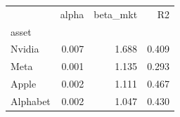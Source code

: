 \begin{tabular}{lrrr}
\toprule
 & alpha & beta_mkt & R2 \\
asset &  &  &  \\
\midrule
Nvidia & 0.007 & 1.688 & 0.409 \\
Meta & 0.001 & 1.135 & 0.293 \\
Apple & 0.002 & 1.111 & 0.467 \\
Alphabet & 0.002 & 1.047 & 0.430 \\
\bottomrule
\end{tabular}
